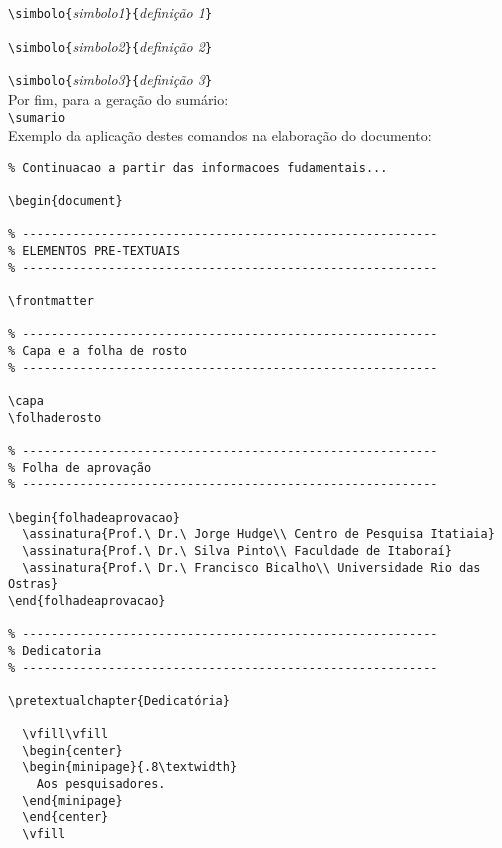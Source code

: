 \documentclass[a4paper,12pt,oneside,onecolumn]{article}
\newcommand{\comando}[1]{\texttt{\textbackslash #1}}
\newcommand{\param}[1]{\texttt{\{}\textsl{#1}\texttt{\}}}
\begin{document}
\comando{simbolo}\param{simbolo1}\param{definição 1}

\comando{simbolo}\param{simbolo2}\param{definição 2}

\comando{simbolo}\param{simbolo3}\param{definição 3}\\

Por fim, para a geração do sumário:\\

\comando{sumario}\\

Exemplo da aplicação destes comandos na elaboração do documento:\\

\begin{verbatim}
% Continuacao a partir das informacoes fudamentais...

\begin{document}

% ----------------------------------------------------------
% ELEMENTOS PRE-TEXTUAIS
% ----------------------------------------------------------

\frontmatter

% ----------------------------------------------------------
% Capa e a folha de rosto
% ----------------------------------------------------------

\capa
\folhaderosto

% ----------------------------------------------------------
% Folha de aprovação
% ----------------------------------------------------------

\begin{folhadeaprovacao}
  \assinatura{Prof.\ Dr.\ Jorge Hudge\\ Centro de Pesquisa Itatiaia}
  \assinatura{Prof.\ Dr.\ Silva Pinto\\ Faculdade de Itaboraí}
  \assinatura{Prof.\ Dr.\ Francisco Bicalho\\ Universidade Rio das Ostras}
\end{folhadeaprovacao}

% ----------------------------------------------------------
% Dedicatoria
% ----------------------------------------------------------

\pretextualchapter{Dedicatória}

  \vfill\vfill
  \begin{center}
  \begin{minipage}{.8\textwidth}
    Aos pesquisadores.
  \end{minipage}
  \end{center}
  \vfill


\end{verbatim}
\end{document}
